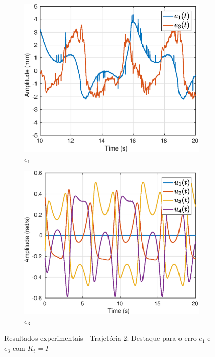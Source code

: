 \begin{figure}[H]
\centering
\begin{subfigure}{.5\textwidth}
  \centering
  \includegraphics[width=\linewidth]{./img/traj_2_k1/error.eps}
  \caption{$e_1$}
  \label{fig:sub1}
\end{subfigure}%
\begin{subfigure}{.5\textwidth}
  \centering
  \includegraphics[width=\linewidth]{./img/traj_2_k1/u.eps}
  \caption{$e_3$}
  \label{fig:sub2}
\end{subfigure}
\caption{Resultados experimentais - Trajetória 2: Destaque para o erro $e_1$ e $e_3$ com ${K}_t = {I}$}
\label{fig:erro_traj}
\end{figure}

